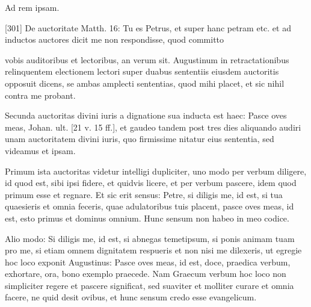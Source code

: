 Ad rem ipsam.

[301] De auctoritate Matth. 16: Tu es Petrus, et super hanc petram etc. et ad inductos auctores dicit me non respondisse, quod committo

vobis auditoribus et lectoribus, an verum sit. Augustinum in retractationibus relinquentem electionem lectori super duabus sententiis eiusdem auctoritis opposuit dicens, se ambas amplecti sententias, quod mihi placet, et sic nihil contra me probant.

Secunda auctoritas divini iuris a dignatione sua inducta est haec: Pasce oves meas, Johan. ult. [21 v. 15 ff.], et gaudeo tandem post tres dies aliquando audiri unam auctoritatem divini iuris, quo firmissime nitatur eius sententia, sed videamus et ipsam.

Primum ista auctoritas videtur intelligi dupliciter, uno modo per verbum diligere, id quod est, sibi ipsi fidere, et quidvis licere, et per verbum pascere, idem quod primum esse et regnare. Et sic erit sensus: Petre, si diligis me, id est, si tua quaesieris et omnia feceris, quae adulatoribus tuis placent, pasce oves meas, id est, esto primus et dominus omnium. Hunc sensum non habeo in meo codice.

Alio modo: Si diligis me, id est, si abnegas temetipsum, si ponis animam tuam pro me, si etiam omnem dignitatem respueris et non nisi me dilexeris, ut egregie hoc loco exponit Augustinus: Pasce oves meas, id est, doce, praedica verbum, exhortare, ora, bono exemplo praecede. Nam Graecum verbum hoc loco non simpliciter regere et pascere significat, sed suaviter et molliter curare et omnia facere, ne quid desit ovibus, et hunc sensum credo esse evangelicum.


